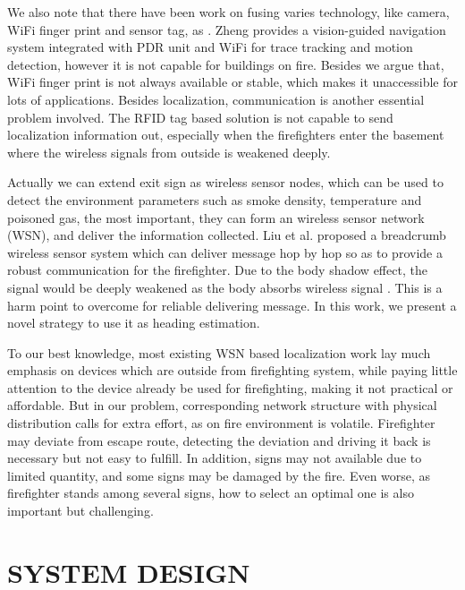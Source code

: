 \documentclass[conference]{IEEEtran}
\begin{document}
We also note that there have been work on fusing varies technology, like camera, WiFi finger print and sensor tag, as \cite{correa2014enhanced}\cite{gadeke2011pedestrian}\cite{schmid2011fusion}\cite{zheng2014travi}. Zheng \cite{zheng2014travi} provides a vision-guided navigation system integrated with PDR unit and WiFi for trace tracking and motion detection, however it is not capable for buildings on fire. Besides we argue that, WiFi finger print is not always available or stable, which makes it unaccessible for lots of applications. Besides localization, communication is another essential problem involved. The RFID tag based solution is not capable to send localization information out, especially when the firefighters enter the basement where the wireless signals from outside is weakened deeply. 

Actually we can extend exit sign as wireless sensor nodes, which can be used to detect the environment parameters such as smoke density, temperature and poisoned gas, the most important, they can form an wireless sensor network (WSN), and deliver the information collected. Liu \cite{liu2010automatic} et al. proposed a breadcrumb wireless sensor system which can deliver message hop by hop so as to provide a robust communication for the firefighter. Due to the body shadow effect, the signal would be deeply weakened as the body absorbs wireless signal \cite{liu2014providing}. This is a harm point to overcome for reliable delivering message. In this work, we present a novel strategy to use it as heading estimation.

To our best knowledge, most existing WSN based localization work lay much emphasis on devices which are outside from firefighting system, while paying little attention to the device already be used for firefighting, making it not practical or affordable. But in our problem, corresponding network structure with physical distribution calls for extra effort, as on fire environment is volatile. Firefighter may deviate from escape route, detecting the deviation and driving it back is necessary but not easy to fulfill. In addition, signs may not available due to limited quantity, and some signs may be damaged by the fire.  Even worse, as firefighter stands among several signs, how to select an optimal one is also important but  challenging.


\section{SYSTEM DESIGN}
\end{document}
